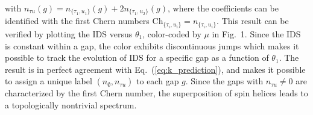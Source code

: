 \documentclass[
    10pt,
    aps,
    prr,
    twocolumn,
    floatfix,
    superscriptaddress
]{revtex4-2}
\begin{document}
with $n_{\tau u}(g) =  n_{ \lbrace \tau_1, u_1 \rbrace}(g) + 2 n_{ \lbrace \tau_1, u_2 \rbrace}(g) $, where the coefficients can be identified with the first Chern numbers 
$ \mathrm{Ch}_{ \lbrace \tau_i, u_i \rbrace} = n_{ \lbrace \tau_i, u_i \rbrace}$. 
This result can be verified by plotting the IDS versus $\theta_1$, color-coded by $\mu$ in Fig.~1.
Since the IDS is constant within a gap, the color exhibits discontinuous jumps which makes it possible to track the evolution of IDS for a specific gap as a function of $\theta_1$.
The result is in perfect agreement with Eq.~(\ref{eq:k_prediction}), and makes it possible to assign a unique label $(n_\emptyset, n_{\tau u})$ to each gap $g$.
Since the gaps with $n_{\tau u} \neq 0$ are characterized by the first Chern number, the superposition of spin helices leads to a topologically nontrivial spectrum.


\end{document}
